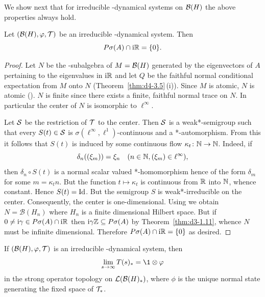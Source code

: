 We show next that for irreducible \WA-dynamical systems on $ \mathcal{B}(H) $  the above properties always hold.
\begin{theorem}\label{thm:d4-3.8}
Let $ (\BH,\phi,\TT) $  be an irreducible \WA-dynamical system.
Then
\[
P\sigma(A) \cap \mathrm{i}\mathbb{R} = \{0\} .
\]

\end{theorem}
\begin{proof}
Let $ N $  be the \WA-subalgebra of\/ $ M = \mathcal{B}(H) $  generated by the eigenvectors of\/ $ A $  pertaining to the eigenvalues in $ \mathrm{i}\mathbb{R} $  and let $ Q $  be the faithful normal conditional expectation from $ M $  onto $ N $  (Theorem~\ref{thm:d4-3.5}\,(i)).
Since $ M $  is atomic, $ N $  is atomic (\textcite{stormer:1972}).
$ N $  is finite since there exists a finite, faithful normal trace on $ N $.
In particular the center of\/ $ N $  is isomorphic to $ \ell^{\infty} $.

Let $ \mathcal{S} $  be the restriction of\/ $ \mathcal{T} $  to the center.
Then $ \mathcal{S} $  is a weak*-semigroup such that every $ S(t) \in \mathcal{S} $  is $ \sigma(\ell^{\infty},\ell^{1}) $-continuous and a *-automorphism.
From this it follows that $ S(t) $  is induced by some continuous flow $ \kappa_{t} \colon \mathbb{N} \to \mathbb{N} $.
Indeed, if\/ 
\[ 
\delta_{n}((\xi_{m})) = \xi_{n} \quad (n \in \mathbb{N}, (\xi_{m}) \in \ell^{\infty}),
\]
then $ \delta_{n} \circ S(t) $  is a normal scalar valued *-homomorphism hence of the form $ \delta_{m} $  for some $ m = \kappa_{t}n $.
But the function $ t \mapsto \kappa_{t} $  is continuous from $ \mathbb{R} $  into $ \mathbb{N} $, whence constant.
Hence $ S(t) = \operatorname{Id} $.
But the semigroup $ S $  is weak*-irreducible on the center.
Consequently, the center is one-dimensional.
Using \textcite[Theorem V.1.27]{takesaki:1979} we obtain $ N = \mathcal{B}(H_{n}) $  where $ H_{n} $  is a finite dimensional Hilbert space.
But if\/ $ 0 \neq \mathrm{i}\gamma \in P\sigma(A) \cap \mathrm{i}\mathbb{R} $  then $ \mathrm{i}\gamma\mathbb{Z} \subseteq P\sigma(A) $  by Theorem~\ref{thm:d3-1.11}, whence $ N $  must be infinite dimensional.
Therefore $ P\sigma(A) \cap \mathrm{i}\mathbb{R} = \{0\} $  as desired.
\end{proof}
\begin{corollary}\label{cor:d4-3.9}
If\/ $ (\BH,\phi,\TT) $  is an irreducible \WA-dynamical system, then
\[
	\lim_{s \to \infty} T(s)_{*} = \1 \otimes \phi
\]
in the strong operator topology on $ \mathcal{L}(\mathcal{B}(H)_{*}) $, where $ \phi $  is the unique normal state generating the fixed space of\/ $ \mathcal{T}_{*} $.
\end{corollary}
